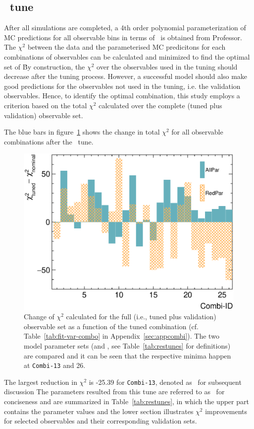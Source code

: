     \subsection{\allpar\ tune}
    After all simulations are completed, a 4th order polynomial parameterization of MC predictions for all observable bins in terms of \allpar\ is obtained from Professor.
    The $\chi^2$ between the data and the parameterised MC predicitons for each combinations of observables can be calculated and minimized to find the optimal set of \allpar\.
    By construction, the $\chi^2$ over the observables used in the tuning should decrease after the tuning process.
    However, a successful model should also make good predictions for the observables not used in the tuning, i.e. the validation observables.
    Hence, to identify the optimal combination, this study employs a criterion based on the total $\chi^2$ calculated over the complete (tuned plus validation) observable set.

    The blue bars in figure~\ref{fig:allchi} shows the change in total $\chi^2$ for all observable combinations after the \allbar\ tune.
    \begin{figure}[!htb] 
        \centering 		
        \includegraphics[width=\sgfigwid\textwidth]{figures/tuning/chi2_hist_covfix.eps} 
        \caption{\label{fig:allchi} Change of $\chi^2$ calculated for the full (i.e., tuned plus validation) observable set as a function of the tuned combination (cf. Table~\ref{tab:fit-var-combo} in Appendix~\ref{sec:appcombi}). The two model parameter sets (\allpar and \redpar, see Table~\ref{tab:restunes} for definitions) are compared and it can be seen that the respective minima happen at \texttt{Combi-13} and 26. }   
    \end{figure}
    The largest reduction in $\chi^2$ is -25.39 for \texttt{Combi-13}, denoted as \cbAllPar\ for subsequent discussion
    The parameters resulted from this tune are referred to as \gT\ for conciseness and are summarized in Table~\ref{tab:restunes}, in which the upper part contains the parameter values and the lower section illustrates $\chi^2$ improvements for selected observables and their corresponding validation sets. 

